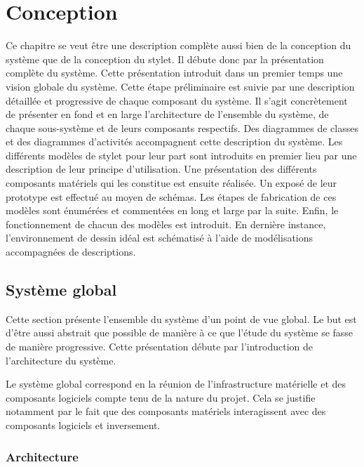 \documentclass[11pt,a4paper,oldfontcommands]{memoir}
\begin{document}

\chapter{Conception}

Ce chapitre se veut être une description complète aussi bien de la conception du système que de la conception du stylet. Il débute donc par la présentation complète du système. Cette présentation introduit dans un premier temps une vision globale du système. Cette étape préliminaire est suivie par une description détaillée et progressive de chaque composant du système. Il s'agit concrètement de présenter en fond et en large l'architecture de l'ensemble du système, de chaque sous-système et de leurs composants respectifs. Des diagrammes de classes et des diagrammes d'activités accompagnent cette description du système. Les différents modèles de stylet pour leur part sont introduits en premier lieu par une description de leur principe d'utilisation. Une présentation des différents composants matériels qui les constitue est ensuite réalisée. Un exposé de leur prototype est effectué au moyen de schémas. Les étapes de fabrication de ces modèles sont énumérées et commentées en long et large par la suite. Enfin, le fonctionnement de chacun des modèles est introduit. En dernière instance, l'environnement de dessin idéal est schématisé à l'aide de modélisations accompagnées de descriptions.

\section{Système global}

Cette section présente l'ensemble du système d'un point de vue global. Le but est d'être aussi abstrait que possible de manière à ce que l'étude du système se fasse de manière progressive. Cette présentation débute par l'introduction de l'architecture du système.

Le système global correspond en la réunion de l'infrastructure matérielle et des composants logiciels compte tenu de la nature du projet. Cela se justifie notamment par le fait que des composants matériels interagissent avec des composants logiciels et inversement.

\subsection{Architecture}
\end{document}
